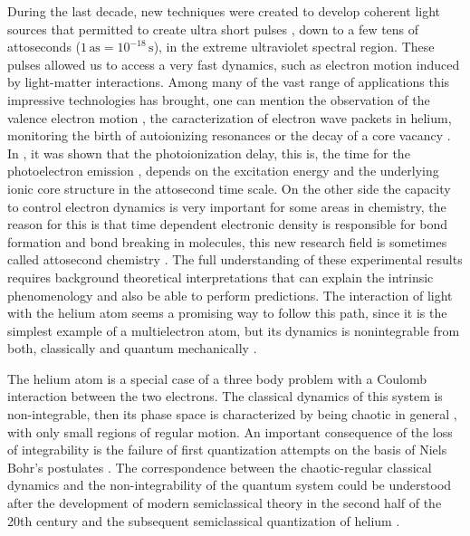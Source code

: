During the last decade, new techniques were created to develop coherent light sources that permitted to create ultra short pulses \cite{doi:10.1021/acs.chemrev.6b00453}, down to a few tens of attoseconds ($ 1\, \textrm{as}=10^{-18} \, \textrm{s} $), in the extreme ultraviolet spectral region. These pulses allowed us to access a very fast dynamics, such as electron motion induced by light-matter interactions. Among many of the vast range of applications this impressive technologies has brought, one can mention the observation of the valence electron motion \cite{article}, the caracterization of electron wave packets in helium, monitoring the birth of autoionizing resonances \cite{Gruson734} or the decay of a core vacancy \cite{article2}. In \cite{Schultze1658}, it was shown that the photoionization delay, this is,  the time for the photoelectron emission \cite{cavalieri2007attosecond}, depends on the excitation energy and the underlying ionic core structure in the attosecond time scale. On the other side the capacity to control electron dynamics is very important for some areas in chemistry, the reason for this is that time dependent electronic density is responsible for bond formation and bond breaking in molecules, this new research field is sometimes called attosecond chemistry \cite{RevModPhys.81.163,article3}. The full understanding of these experimental results requires background theoretical interpretations that can explain the intrinsic phenomenology and also be able to perform predictions. The interaction of light with the helium atom seems a promising way to follow this path, since it is the simplest example of a multielectron atom, but its dynamics is nonintegrable from both, classically and quantum mechanically \cite{thesisalejo}.

The helium atom is a special case of a three body problem with a Coulomb interaction between the two electrons. The classical dynamics of this system is non-integrable, then its phase space is characterized by being chaotic in general \cite{richter1993intra}, with only small regions of regular motion. An important consequence of the loss of integrability is the failure of first quantization attempts on the basis of Niels Bohr's postulates \cite{doi:10.1080/14786441308634955,einstein1917quantensatz,doi:10.1080/14786441308634993}. The correspondence between the chaotic-regular classical dynamics and the non-integrability of the quantum system \cite{RevModPhys.72.497} could be understood after the development of modern semiclassical theory in the second half of the 20th century \cite{gutzwiller1967phase,gutzwiller1971periodic} and the subsequent semiclassical quantization of helium \cite{ezra1991semiclassical,leopold1980semiclassical}.

